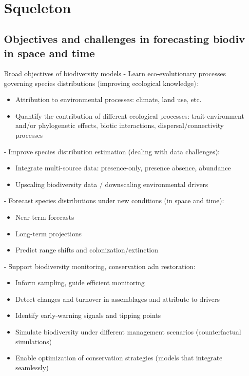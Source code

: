 \section{Squeleton}

\subsection{Objectives and challenges in forecasting biodiv in space and time} %

Broad objectives of biodiversity models
- Learn eco-evolutionary processes governing species distributions (improving ecological knowledge):
\begin{itemize}
    \item Attribution to environmental processes: climate, land use, etc.
    \item Quantify the contribution of different ecological processes: trait-environment and/or phylogenetic effects, biotic interactions, dispersal/connectivity processes
\end{itemize}

- Improve species distribution  estimation (dealing with data challenges):
\begin{itemize}
    \item Integrate multi-source data: presence-only, presence absence, abundance
    \item Upscaling biodiversity data / downscaling environmental drivers
\end{itemize}

- Forecast species distributions under new conditions (in space and time):
\begin{itemize}
    \item Near-term forecasts
    \item Long-term projections
    \item Predict range shifts and colonization/extinction
\end{itemize}

- Support biodiversity monitoring, conservation adn restoration:
\begin{itemize}
    \item Inform sampling, guide efficient monitoring 
    \item Detect changes and turnover in assemblages and attribute to drivers    
    \item Identify early-warning signals and tipping points 
    \item Simulate biodiversity under different management scenarios (counterfactual simulations)
    \item Enable optimization of conservation strategies (models that integrate seamlessly)    
\end{itemize}

